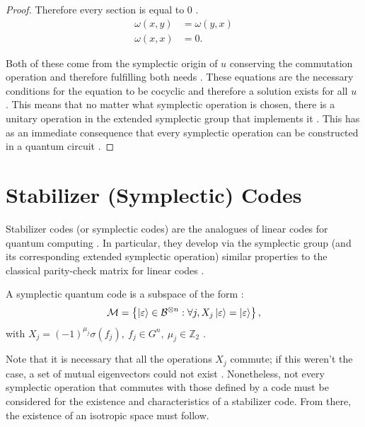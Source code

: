 \begin{theorem}
\begin{proof}
  Therefore every section is equal to $0$ \citep{Cesar2024}.
  \begin{align*}
    \omega(x, y) &= \omega(y, x)\\
    \omega(x, x) &= 0
  .\end{align*}

  Both of these come from the symplectic origin of $u$ conserving the commutation operation and therefore fulfilling both needs \citep{Kitaev2002}. These equations are the necessary conditions for the equation to be cocyclic and therefore a solution exists for all $u$ \citep{Cesar2024}. This means that no matter what symplectic operation is chosen, there is a unitary operation in the extended symplectic group that implements it \citep{Kitaev2002}. This has as an immediate consequence that every symplectic operation can be constructed in a quantum circuit \citep{Kitaev2002}.
  \end{proof}
\end{theorem}

\section{Stabilizer (Symplectic) Codes}

Stabilizer codes (or symplectic codes) are the analogues of linear codes for quantum computing \citep{Kitaev2002}. In particular, they develop via the symplectic group (and its corresponding extended symplectic operation) similar properties to the classical parity-check matrix for linear codes \citep{Kitaev2002}.

\begin{definition}
  A symplectic quantum code is a subspace of the form \citep{Kitaev2002}:
  \begin{equation}
    \mathcal{M} = \left\{\ket{\varepsilon} \in \mathcal{B}^{\otimes n} : \forall j,  X_j \ket{\varepsilon} = \ket{\varepsilon} \right\}
    \label{eq:def_stabilizers}
  ,\end{equation}
  with $X_j = (-1)^{\mu_j} \sigma(f_j),\ f_j \in G^n,\ \mu_j \in \mathbb{Z}_2$ \citep{Kitaev2002}.
\end{definition}

Note that it is necessary that all the operations $X_j$ commute; if this weren't the case, a set of mutual eigenvectors could not exist \citep{Kitaev2002}. Nonetheless, not every symplectic operation that commutes with those defined by a code must be considered for the existence and characteristics of a stabilizer code. From there, the existence of an isotropic space must follow.

